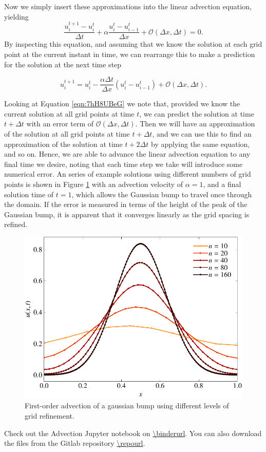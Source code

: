 Now we simply insert these approximations into the linear advection equation, yielding
\begin{equation}
	\frac{u_i^{t+1} - u_{i}^t}{\Delta t} +  \alpha \frac{u_i^t - u_{i-1}^t}{\Delta x} + \mathcal{O}(\Delta x, \Delta t) = 0.
\end{equation}
By inspecting this equation, and assuming that we know the solution at each grid point at the current instant in time, we can rearrange this to make a prediction for the solution at the next time step
\begin{eqBox}
\begin{equation}
	u_i^{t+1} = u_{i}^t -\frac{\alpha \Delta t}{\Delta x} \left( u_i^t - u_{i-1}^t \right) + \mathcal{O}(\Delta x, \Delta t).
	\label{eqn:7hH8UBeG}
\end{equation}
\end{eqBox}

Looking at Equation \ref{eqn:7hH8UBeG} we note that, provided we know the current solution at all grid points at time $t$, we can predict the solution at time $t+\Delta t$ with an error term of $\mathcal{O}(\Delta x, \Delta t)$. Then we will have an approximation of the solution at all grid points at time $t+\Delta t$, and we can use this to find an approximation of the solution at time $t+2\Delta t$ by applying the same equation, and so on. Hence, we are able to advance the linear advection equation to any final time we desire, noting that each time step we take will introduce some numerical error. An series of example solutions using different numbers of grid points is shown in Figure \ref{fig:advection_upwind} with an advection velocity of $\alpha = 1$, and a final solution time of $t=1$, which allows the Gaussian bump to travel once through the domain. If the error is measured in terms of the height of the peak of the Gaussian bump, it is apparent that it converges linearly as the grid spacing is refined.
\begin{figure}[htbp]
	\centering
	\includegraphics[width=0.65\linewidth]{Pictures/advection_upwind}
	\caption{First-order advection of a gaussian bump using different levels of grid refinement.}
	\label{fig:advection_upwind}
\end{figure}
\begin{jupyternote}
	Check out the Advection Jupyter notebook on \url{\binderurl}. You can also download the files from the Gitlab repository \url{\repourl}.
\end{jupyternote}
